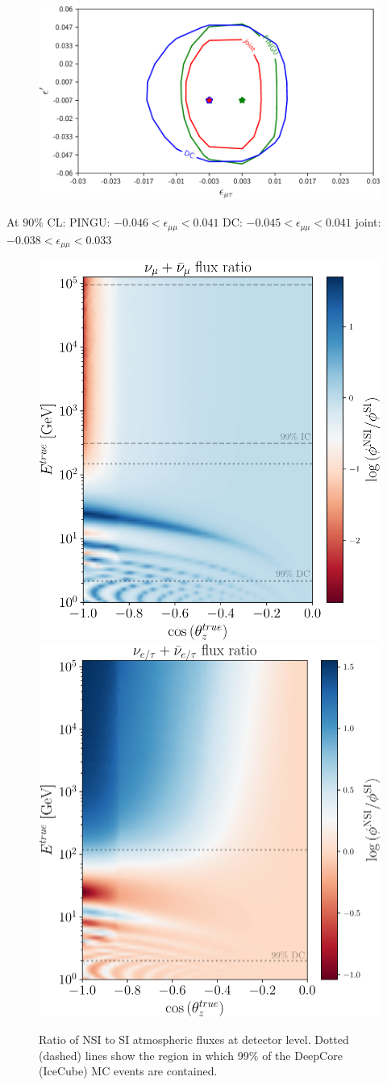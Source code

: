 \documentclass[draft=True]{revtex4-2}
\newcommand{\emm}{\ensuremath{\epsilon_{\mu\mu}}}
\begin{document}
 \begin{figure}[!tb]
    \begin{center}
       \includegraphics[width=0.4\linewidth]{figures/emm_emp_contour.pdf}
    \end{center}
    \caption{}\label{fig:emm_emp_contour}
 \end{figure}
At $90\%$ CL:
PINGU: $-0.046 < \emm < 0.041$
DC: $-0.045 < \emm < 0.041$
joint: $-0.038 < \emm < 0.033$
\begin{figure}[!tb]
    \begin{center}
       \includegraphics[width=0.4\linewidth]{figures/track_flux_ratio.pdf}
       \includegraphics[width=0.4\linewidth]{figures/cascade_flux_ratio.pdf}
    \end{center}
    \caption{Ratio of NSI to SI atmospheric fluxes at detector level. Dotted (dashed) lines show the region in which 99\% of the 
    DeepCore (IceCube) MC events are contained.}\label{fig:flux_ratio}
 \end{figure}


\end{document}
